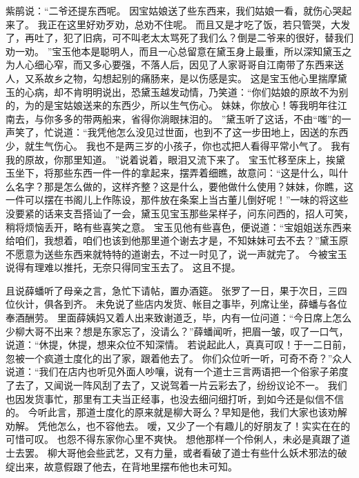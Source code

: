 紫鹃说：“二爷还提东西呢。
因宝姑娘送了些东西来，我们姑娘一看，就伤心哭起来了。
我正在这里好劝歹劝，总劝不住呢。
而且又是才吃了饭，若只管哭，大发了，再吐了，犯了旧病，可不叫老太太骂死了我们么？倒是二爷来的很好，替我们劝一劝。
”宝玉他本是聪明人，而且一心总留意在黛玉身上最重，所以深知黛玉之为人心细心窄，而又多心要强，不落人后，因见了人家哥哥自江南带了东西来送人，又系故乡之物，勾想起别的痛肠来，是以伤感是实。
这是宝玉他心里揣摩黛玉的心病，却不肯明明说出，恐黛玉越发动情，乃笑道：“你们姑娘的原故不为别的，为的是宝姑娘送来的东西少，所以生气伤心。
妹妹，你放心！等我明年往江南去，与你多多的带两船来，省得你淌眼抹泪的。
”黛玉听了这话，不由“嗤”的一声笑了，忙说道：“我凭他怎么没见过世面，也到不了这一步田地上，因送的东西少，就生气伤心。
我也不是两三岁的小孩子，你也忒把人看得平常小气了。
我有我的原故，你那里知道。
”说着说着，眼泪又流下来了。
宝玉忙移至床上，挨黛玉坐下，将那些东西一件一件的拿起来，摆弄着细瞧，故意问：“这是什么，叫什么名字？那是怎么做的，这样齐整？这是什么，要他做什么使用？妹妹，你瞧，这一件可以摆在书阁儿上作陈设，那件放在条案上当古董儿倒好呢！”一味的将这些没要紧的话来支吾搭讪了一会，黛玉见宝玉那些呆样子，问东问西的，招人可笑，稍将烦恼丢开，略有些喜笑之意。
宝玉见他有些喜色，便说道：“宝姐姐送东西来给咱们，我想着，咱们也该到他那里道个谢去才是，不知妹妹可去不去？”黛玉原不愿意为送些东西来就特特的道谢去，不过一时见了，说一声就完了。
今被宝玉说得有理难以推托，无奈只得同宝玉去了。
这且不提。
\par
且说薛蟠听了母亲之言，急忙下请帖，置办酒筵。
张罗了一日，果于次日，三四位伙计，俱各到齐。
未免说了些店内发货、帐目之事毕，列席让坐，薛蟠与各位奉酒酬劳。
里面薛姨妈又着人出来致谢道乏，毕，内有一位问道：“今日席上怎么少柳大哥不出来？想是东家忘了，没请么？”薛蟠闻听，把眉一皱，叹了一口气，说道：“休提，休提，想来众位不知深情。
若说起此人，真真可叹！于一二日前，忽被一个疯道士度化的出了家，跟着他去了。
你们众位听一听，可奇不奇？”众人说道：“我们在店内也听见外面人吵嚷，说有一个道士三言两语把一个俗家子弟度了去了，又闻说一阵风刮了去了，又说驾着一片云彩去了，纷纷议论不一。
我们也因发货事忙，那里有工夫当正经事，也没去细问细打听，到如今还是似信不信的。
今听此言，那道士度化的原来就是柳大哥么？早知是他，我们大家也该劝解劝解。
凭他怎么，也不容他去。
嗳，又少了一个有趣儿的好朋友了！实实在在的可惜可叹。
也怨不得东家你心里不爽快。
想他那样一个伶俐人，未必是真跟了道士去罢。
柳大哥他会些武艺，又有力量，或者看破了道士有些什么妖术邪法的破绽出来，故意假跟了他去，在背地里摆布他也未可知。

